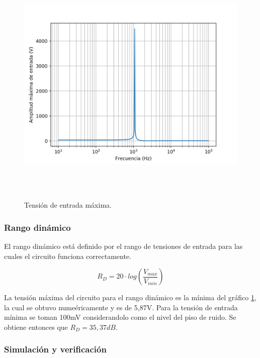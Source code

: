 \begin{figure}[H] %
	\centering	\includegraphics[width=12cm,height=12cm,keepaspectratio]{../EJ4/graficos/vinmax.png}
	\caption{Tensi\'on de entrada m\'axima.}
	\label{vimax}
\end{figure}


\subsubsection*{Rango din\'amico}

El rango din\'amico est\'a definido por el rango de tensiones de entrada para las cuales el circuito funciona correctamente. 

\begin{equation}
R_D = 20 \cdot log\left( \frac{V_{max}}{V_{min}}\right)
\end{equation}

La tensi\'on m\'axima del circuito para el rango din\'amico es la m\'inima del gr\'afico \ref{vimax}, la cual se obtuvo nume\'ericamente y es de 5,87V. Para la tensi\'on de entrada m\'inima se toman 100mV considerandolo como el nivel del piso de ruido. Se obtiene entonces que $R_D=35,37dB$.



\subsubsection{Simulaci\'on y verificaci\'on}

